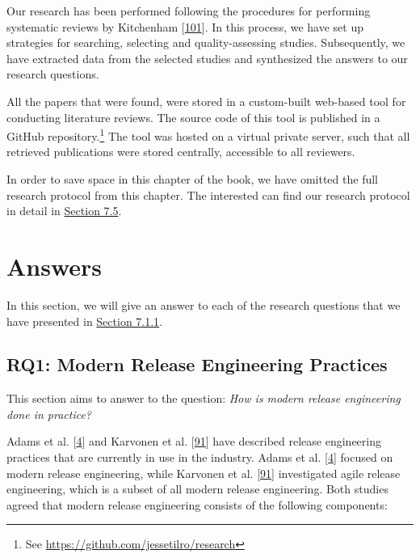 \documentclass[]{book}
\let\rmarkdownfootnote\footnote%
\def\footnote{\protect\rmarkdownfootnote}
\begin{document}
Our research has been performed following the procedures for performing
systematic reviews by Kitchenham
{[}\protect\hyperlink{ref-kitchenham2004procedures}{101}{]}. In this
process, we have set up strategies for searching, selecting and
quality-assessing studies. Subsequently, we have extracted data from the
selected studies and synthesized the answers to our research questions.

All the papers that were found, were stored in a custom-built web-based
tool for conducting literature reviews. The source code of this tool is
published in a GitHub repository.\footnote{See
  \url{https://github.com/jessetilro/research}} The tool was hosted on a
virtual private server, such that all retrieved publications were stored
centrally, accessible to all reviewers.

In order to save space in this chapter of the book, we have omitted the
full research protocol from this chapter. The interested can find our
research protocol in detail in \protect\hyperlink{appendix}{Section
7.5}.

\section{Answers}\label{answers-3}

In this section, we will give an answer to each of the research
questions that we have presented in
\protect\hyperlink{research-questions-1}{Section 7.1.1}.

\subsection{RQ1: Modern Release Engineering
Practices}\label{rq1-modern-release-engineering-practices}

This section aims to answer to the question: \emph{How is modern release
engineering done in practice?}

Adams et al. {[}\protect\hyperlink{ref-adams2016a}{4}{]} and Karvonen et
al. {[}\protect\hyperlink{ref-karvonen2017a}{91}{]} have described
release engineering practices that are currently in use in the industry.
Adams et al. {[}\protect\hyperlink{ref-adams2016a}{4}{]} focused on
modern release engineering, while Karvonen et al.
{[}\protect\hyperlink{ref-karvonen2017a}{91}{]} investigated agile
release engineering, which is a subset of all modern release
engineering. Both studies agreed that modern release engineering
consists of the following components:
\end{document}
